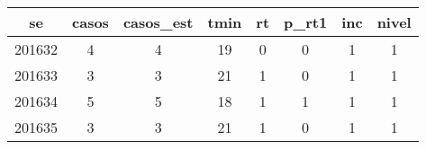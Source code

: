 \begin{tabular}{c|ccccccc}
  \hline
se & casos & casos\_est & tmin & rt & p\_rt1 & inc & nivel \\ 
  \hline
201632 & 4 & 4 & 19 & 0 & 0 & 1 & 1 \\ 
  201633 & 3 & 3 & 21 & 1 & 0 & 1 & 1 \\ 
  201634 & 5 & 5 & 18 & 1 & 1 & 1 & 1 \\ 
  201635 & 3 & 3 & 21 & 1 & 0 & 1 & 1 \\ 
   \hline
\end{tabular}
